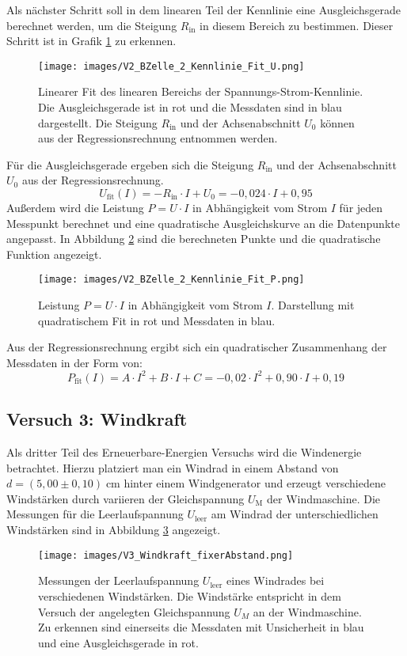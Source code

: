 \documentclass{article}
\begin{document}
\noindent Als nächster Schritt soll in dem linearen Teil der Kennlinie eine Ausgleichsgerade berechnet werden, um die Steigung $R_\text{in}$ in diesem Bereich zu bestimmen. Dieser Schritt ist in Grafik \ref{fig:V2_BZ_lin_fit_Spannung} zu erkennen.
\begin{figure}[H]
    \centering
    \texttt{[image: images/V2\_BZelle\_2\_Kennlinie\_Fit\_U.png]}
    \caption{Linearer Fit des linearen Bereichs der Spannungs-Strom-Kennlinie. Die Ausgleichsgerade ist in rot und die Messdaten sind in blau dargestellt. Die Steigung \(R_\text{in}\) und der Achsenabschnitt \(U_0\) können aus der Regressionsrechnung entnommen werden.}
    \label{fig:V2_BZ_lin_fit_Spannung}
\end{figure}
\noindent Für die Ausgleichsgerade ergeben sich die Steigung $R_\text{in}$ und der Achsenabschnitt $U_0$ aus der Regressionsrechnung.
$$U_\text{fit}(I) = -R_\text{in} \cdot I + U_0 = -0{,}024 \cdot I + 0{,}95$$
Außerdem wird die Leistung $P=U\cdot I$ in Abhängigkeit vom Strom $I$ für jeden Messpunkt berechnet und eine quadratische Ausgleichskurve an die Datenpunkte angepasst. In Abbildung \ref{fig:V2_BZ_quad_fit_Leistung} sind die berechneten Punkte und die quadratische Funktion angezeigt.
\begin{figure}[H]
    \centering
    \texttt{[image: images/V2\_BZelle\_2\_Kennlinie\_Fit\_P.png]}
    \caption{Leistung \(P=U\cdot I\) in Abhängigkeit vom Strom \(I\). Darstellung mit quadratischem Fit in rot und Messdaten in blau.}
    \label{fig:V2_BZ_quad_fit_Leistung}
\end{figure}
\noindent Aus der Regressionsrechnung \cite{Fit} ergibt sich ein quadratischer Zusammenhang der Messdaten in der Form von:
$$P_\text{fit}(I) = A \cdot I^2 + B\cdot I + C = -0{,}02 \cdot I^2 + 0{,}90 \cdot I + 0{,}19$$

\subsection{Versuch 3: Windkraft}
\noindent Als dritter Teil des Erneuerbare-Energien Versuchs wird die Windenergie betrachtet. Hierzu platziert man ein Windrad in einem Abstand von $d=(5{,}00 \pm 0{,}10) \; \text{cm}$ hinter einem Windgenerator und erzeugt verschiedene Windstärken durch variieren der Gleichspannung $U_\text{M}$ der Windmaschine.
Die Messungen für die Leerlaufspannung $U_\text{leer}$ am Windrad der unterschiedlichen Windstärken sind in Abbildung \ref{fig:V3_WK_fixer_Abstand} angezeigt.
\begin{figure}[h!]
    \centering
    \texttt{[image: images/V3\_Windkraft\_fixerAbstand.png]}
    \caption{Messungen der Leerlaufspannung $U_\text{leer}$ eines Windrades bei verschiedenen Windstärken. Die Windstärke entspricht in dem Versuch der angelegten Gleichspannung $U_M$ an der Windmaschine. Zu erkennen sind einerseits die Messdaten mit Unsicherheit in blau und eine Ausgleichsgerade in rot.}
    \label{fig:V3_WK_fixer_Abstand}
\end{figure}
\end{document}
